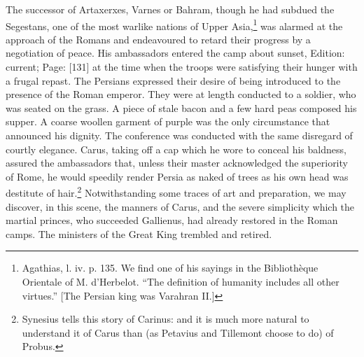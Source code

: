 The successor of Artaxerxes, Varnes or Bahram, though he had subdued the Segestans, one of the most warlike nations of Upper Asia,\footnote{Agathias, l. iv. p. 135. We find one of his sayings in the Bibliothèque Orientale of M. d\texthebrew{}’Herbelot. \texthebrew{“}The definition of humanity includes all other virtues.\texthebrew{}” [The Persian king was Varahran II.]} was alarmed at the approach of the Romans and endeavoured to retard their progress by a negotiation of peace. His ambassadors entered the camp about sunset, Edition: current; Page: [131] at the time when the troops were satisfying their hunger with a frugal repast. The Persians expressed their desire of being introduced to the presence of the Roman emperor. They were at length conducted to a soldier, who was seated on the grass. A piece of stale bacon and a few hard peas composed his supper. A coarse woollen garment of purple was the only circumstance that announced his dignity. The conference was conducted with the same disregard of courtly elegance. Carus, taking off a cap which he wore to conceal his baldness, assured the ambassadors that, unless their master acknowledged the superiority of Rome, he would speedily render Persia as naked of trees as his own head was destitute of hair.\footnote{Synesius tells this story of Carinus: and it is much more natural to understand it of Carus than (as Petavius and Tillemont choose to do) of Probus.} Notwithstanding some traces of art and preparation, we may discover, in this scene, the manners of Carus, and the severe simplicity which the martial princes, who succeeded Gallienus, had already restored in the Roman camps. The ministers of the Great King trembled and retired.

